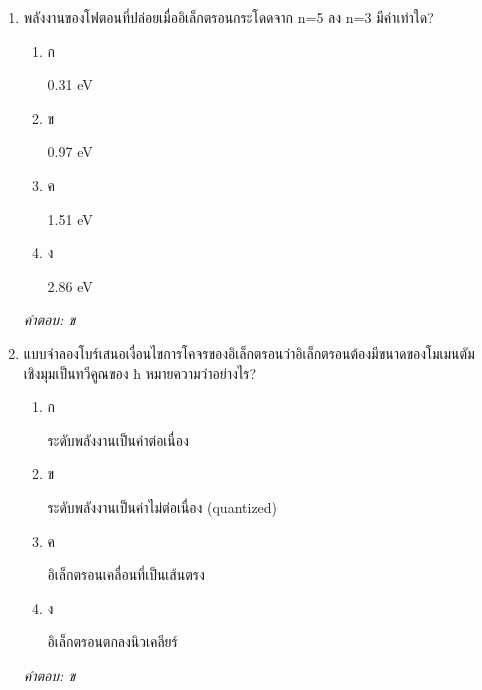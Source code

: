 \documentclass[12pt]{article}
\begin{document}
\begin{enumerate}[label=\arabic*., itemsep=0.5\baselineskip, topsep=0.5\baselineskip, leftmargin=*]
\item พลังงานของโฟตอนที่ปล่อยเมื่ออิเล็กตรอนกระโดดจาก n=5 ลง n=3 มีค่าเท่าใด?
\begin{enumerate}[label=\alph*)., itemsep=0.3\baselineskip, topsep=0.3\baselineskip]
\item ก\ 
\begin{minipage}[t]{0.9\linewidth}
\raggedright 0.31 eV
\end{minipage}
\item ข\ 
\begin{minipage}[t]{0.9\linewidth}
\raggedright 0.97 eV
\end{minipage}
\item ค\ 
\begin{minipage}[t]{0.9\linewidth}
\raggedright 1.51 eV
\end{minipage}
\item ง\ 
\begin{minipage}[t]{0.9\linewidth}
\raggedright 2.86 eV
\end{minipage}
\end{enumerate}
\vspace{-0.3\baselineskip}
\begin{small}
\textit{คำตอบ: ข}
\end{small}

\item แบบจำลองโบร์เสนอเงื่อนไขการโคจรของอิเล็กตรอนว่าอิเล็กตรอนต้องมีขนาดของโมเมนตัมเชิงมุมเป็นทวีคูณของ ħ หมายความว่าอย่างไร?
\begin{enumerate}[label=\alph*)., itemsep=0.3\baselineskip, topsep=0.3\baselineskip]
\item ก\ 
\begin{minipage}[t]{0.9\linewidth}
\raggedright ระดับพลังงานเป็นค่าต่อเนื่อง
\end{minipage}
\item ข\ 
\begin{minipage}[t]{0.9\linewidth}
\raggedright ระดับพลังงานเป็นค่าไม่ต่อเนื่อง (quantized)
\end{minipage}
\item ค\ 
\begin{minipage}[t]{0.9\linewidth}
\raggedright อิเล็กตรอนเคลื่อนที่เป็นเส้นตรง
\end{minipage}
\item ง\ 
\begin{minipage}[t]{0.9\linewidth}
\raggedright อิเล็กตรอนตกลงนิวเคลียร์
\end{minipage}
\end{enumerate}
\vspace{-0.3\baselineskip}
\begin{small}
\textit{คำตอบ: ข}
\end{small}


\end{enumerate}
\end{document}
